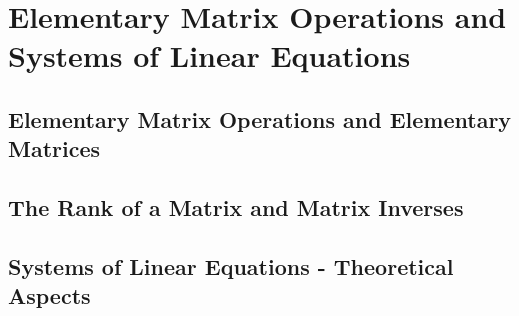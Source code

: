 \setcounter{chapter}{2}
\chapter{Elementary Matrix Operations and Systems of Linear Equations}

\section{Elementary Matrix Operations and Elementary Matrices}



\vspace{12pt}

\setcounter{Exercise}{11}



\section{The Rank of a Matrix and Matrix Inverses}



\vspace{12pt}

\setcounter{Exercise}{2}


\vspace{12pt}



\vspace{12pt}



\vspace{12pt}



\vspace{12pt}



\vspace{12pt}

\setcounter{Exercise}{13}


\vspace{12pt}

\setcounter{Exercise}{16}



\section{Systems of Linear Equations - Theoretical Aspects}

